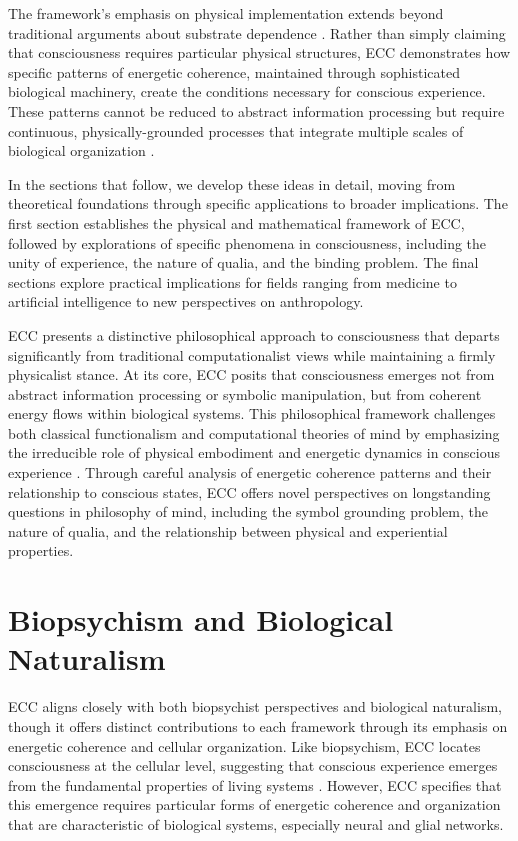 \begin{refsection}
The framework's emphasis on physical implementation extends beyond traditional arguments about substrate dependence \cite{polger2016multiple}. Rather than simply claiming that consciousness requires particular physical structures, ECC demonstrates how specific patterns of energetic coherence, maintained through sophisticated biological machinery, create the conditions necessary for conscious experience. These patterns cannot be reduced to abstract information processing but require continuous, physically-grounded processes that integrate multiple scales of biological organization \cite{maturana1991autopoiesis}.

In the sections that follow, we develop these ideas in detail, moving from theoretical foundations through specific applications to broader implications. The first section establishes the physical and mathematical framework of ECC, followed by explorations of specific phenomena in consciousness, including the unity of experience, the nature of qualia, and the binding problem. The final sections explore practical implications for fields ranging from medicine to artificial intelligence to new perspectives on anthropology.

ECC presents a distinctive philosophical approach to consciousness that departs significantly from traditional computationalist views while maintaining a firmly physicalist stance. At its core, ECC posits that consciousness emerges not from abstract information processing or symbolic manipulation, but from coherent energy flows within biological systems. This philosophical framework challenges both classical functionalism and computational theories of mind by emphasizing the irreducible role of physical embodiment and energetic dynamics in conscious experience \cite{thompson2010mind}. Through careful analysis of energetic coherence patterns and their relationship to conscious states, ECC offers novel perspectives on longstanding questions in philosophy of mind, including the symbol grounding problem, the nature of qualia, and the relationship between physical and experiential properties.

\section{Biopsychism and Biological Naturalism}

ECC aligns closely with both biopsychist perspectives and biological naturalism, though it offers distinct contributions to each framework through its emphasis on energetic coherence and cellular organization. Like biopsychism, ECC locates consciousness at the cellular level, suggesting that conscious experience emerges from the fundamental properties of living systems \cite{edwards2005consciousness, shapiro2007bacteria}. However, ECC specifies that this emergence requires particular forms of energetic coherence and organization that are characteristic of biological systems, especially neural and glial networks.


\end{refsection}
